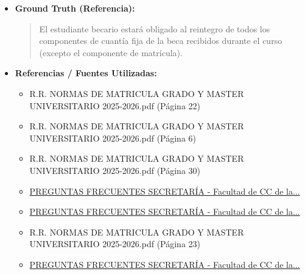 \documentclass[12pt,a4paper,oneside]{report}
\begin{document}
\begin{itemize}
\begin{itemize}
\begin{quote}
Según la normativa, si suspendes más del 50\% de los créditos matriculados, ¿has solicitado beca para el curso 2025-2026?
                \end{quote}
          \item \textbf{{Ground Truth (Referencia):}} \\
                \begin{quote}
El estudiante becario estará obligado al reintegro de todos los componentes de cuantía fija de la beca recibidos durante el curso (excepto el componente de matrícula).
                \end{quote}
          \item \textbf{{Referencias / Fuentes Utilizadas:}} \\
                \begin{itemize}
                  \item R.R. NORMAS DE MATRICULA GRADO Y MASTER UNIVERSITARIO 2025-2026.pdf (Página 22)
                  \item R.R. NORMAS DE MATRICULA GRADO Y MASTER UNIVERSITARIO 2025-2026.pdf (Página 6)
                  \item R.R. NORMAS DE MATRICULA GRADO Y MASTER UNIVERSITARIO 2025-2026.pdf (Página 30)
                  \item \href{https://educacion.us.es/participa/estudiantes/delegacion-de-estudiantes/103-el-centro/1-2-secretaria-administracion/1-2-0-secretaria-del-centro/691-preguntas-frecuentes-secretaria}{PREGUNTAS FRECUENTES SECRETARÍA - Facultad de CC de la...}
                  \item \href{https://educacion.us.es/examenes/103-el-centro/1-2-secretaria-administracion/1-2-0-secretaria-del-centro/691-preguntas-frecuentes-secretaria}{PREGUNTAS FRECUENTES SECRETARÍA - Facultad de CC de la...}
                  \item R.R. NORMAS DE MATRICULA GRADO Y MASTER UNIVERSITARIO 2025-2026.pdf (Página 23)
                  \item \href{https://educacion.us.es/el-centro/secretaria-administracion/secretaria/103-el-centro/1-2-secretaria-administracion/1-2-0-secretaria-del-centro/691-preguntas-frecuentes-secretaria}{PREGUNTAS FRECUENTES SECRETARÍA - Facultad de CC de la...}
                \end{itemize}
        \end{itemize}


\end{itemize}
\end{document}
